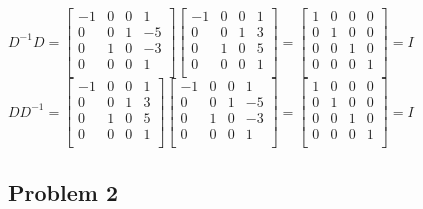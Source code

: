 \documentclass[12pt,letterpaper]{article}
\begin{document}
\begin{enumerate}[leftmargin=*]
$D^{-1} D = 
\begin{bmatrix}
-1 & 0 & 0 &  1\\
 0 & 0 & 1 & -5\\
 0 & 1 & 0 & -3\\
 0 & 0 & 0 &  1\\
\end{bmatrix}
\begin{bmatrix}
-1 & 0 & 0 & 1\\
 0 & 0 & 1 & 3\\
 0 & 1 & 0 & 5\\
 0 & 0 & 0 & 1\\
\end{bmatrix}
= \begin{bmatrix} 1 & 0 & 0 & 0\\ 0 & 1 & 0 & 0\\ 0 & 0 & 1 & 0\\ 0 & 0 & 0 & 1\\ \end{bmatrix} 
= I$\\

$D D^{-1} = 
\begin{bmatrix}
-1 & 0 & 0 & 1\\
 0 & 0 & 1 & 3\\
 0 & 1 & 0 & 5\\
 0 & 0 & 0 & 1\\
\end{bmatrix}
\begin{bmatrix}
-1 & 0 & 0 &  1\\
 0 & 0 & 1 & -5\\
 0 & 1 & 0 & -3\\
 0 & 0 & 0 &  1\\
\end{bmatrix}
= \begin{bmatrix} 1 & 0 & 0 & 0\\ 0 & 1 & 0 & 0\\ 0 & 0 & 1 & 0\\ 0 & 0 & 0 & 1\\ \end{bmatrix} 
= I$\\

\end{enumerate}

\subsection*{Problem 2}
\end{document}
